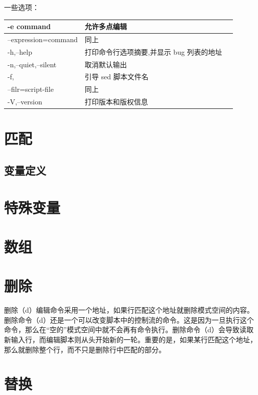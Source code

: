 一些选项：

\begin{tabular}{l|lp{20em}}
\hline
-e command             & 允许多点编辑 \\
\hline
--expression=command   & 同上 \\
\hline
-h,--help              & 打印命令行选项摘要,并显示 bug 列表的地址 \\
\hline
-n,--quiet,--silent    & 取消默认输出 \\
\hline
-f,                    & 引导 sed 脚本文件名 \\
\hline
--filr=script-file     & 同上 \\
\hline
-V,--version           & 打印版本和版权信息\\
\hline
\end{tabular}

\section{匹配}
\label{sec:sedPattern}

\subsection{变量定义}
\label{subsec:sedVariableDef}

\section{特殊变量}
\label{sec:sedSpecialVariable}

\section{数组}
\label{sec:sedArray}

\section{删除}
\label{sec:sedDelete}

删除（d）编辑命令采用一个地址，如果行匹配这个地址就删除模式空间的内容。
删除命令（d）还是一个可以改变脚本中的控制流的命令。这是因为一旦执行这个
命令，那么在“空的”模式空间中就不会再有命令执行。删除命令（d）会导致读取
新输入行，而编辑脚本则从头开始新的一轮。重要的是，如果某行匹配这个地址，
那么就删除整个行，而不只是删除行中匹配的部分。

\section{替换}
 
